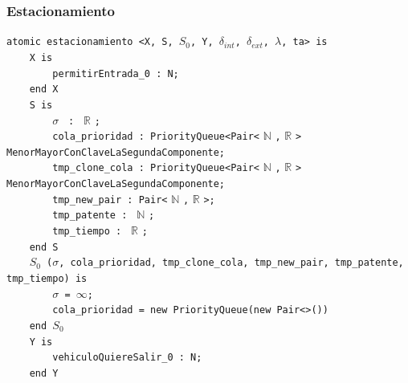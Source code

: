 \documentclass[12pt]{article}
\begin{document}
\subsubsection{Estacionamiento}

\begin{tcolorbox}[
    colback=black!5!white,
    colframe=black!80!white,
    boxrule=0.8pt,
    arc=2pt,
    left=5pt,
    right=5pt,
    top=5pt,
    bottom=5pt,
    fontupper=\ttfamily,
    breakable
]
\begin{flushleft}
\begin{flushleft}
\texttt{atomic estacionamiento <X, S, $S_0$, Y, $\delta_{int}$, $\delta_{ext}$, $\lambda$, ta> is}\\
\texttt{~~~~X is}\\
\texttt{~~~~~~~~permitirEntrada\_0 : N;}\\
\texttt{~~~~end X}\\[5pt]

\texttt{~~~~S is}\\
\texttt{~~~~~~~~}$\sigma$ \texttt{ : } $\mathbb{R}$ \texttt{;} \\
\texttt{~~~~~~~~cola\_prioridad : PriorityQueue<Pair<} $\mathbb{N}$ \texttt{,} $\mathbb{R}$ \texttt{\>> MenorMayorConClaveLaSegundaComponente;}\\
\texttt{~~~~~~~~tmp\_clone\_cola : PriorityQueue<Pair<} $\mathbb{N}$ \texttt{,} $\mathbb{R}$ \texttt{\>> MenorMayorConClaveLaSegundaComponente;}\\
\texttt{~~~~~~~~tmp\_new\_pair : Pair<} $\mathbb{N}$ \texttt{,} $\mathbb{R}$ \texttt{>;}\\
\texttt{~~~~~~~~tmp\_patente : } $\mathbb{N}$ \texttt{;}\\
\texttt{~~~~~~~~tmp\_tiempo : } $\mathbb{R}$ \texttt{;}\\
\texttt{~~~~end S}\\[5pt]

\texttt{~~~~$S_0$ ($\sigma$, cola\_prioridad, tmp\_clone\_cola, tmp\_new\_pair, tmp\_patente, tmp\_tiempo) is} \\
\texttt{~~~~~~~~}$\sigma$\texttt{ = }$\infty$\texttt{;} \\
\texttt{~~~~~~~~cola\_prioridad = new PriorityQueue(new Pair<>())} \\
\texttt{~~~~end }$S_0$ \\ [5pt]

\texttt{~~~~Y is}\\
\texttt{~~~~~~~~vehiculoQuiereSalir\_0 : N;}\\
\texttt{~~~~end Y}\\[5pt]


\end{flushleft}
\end{flushleft}
\end{tcolorbox}
\end{document}
